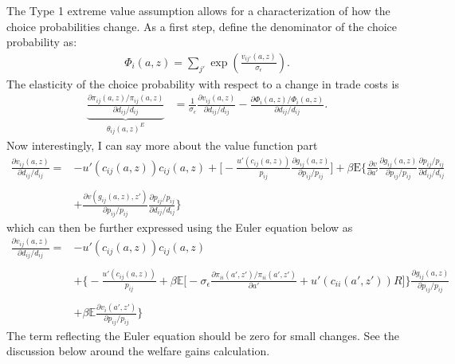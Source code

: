 \documentclass[12pt,pdftex]{article}
\begin{document}
\begin{onehalfspacing}
The Type 1 extreme value assumption allows for a characterization of how the choice probabilities change. As a first step, define the denominator of the choice probability as:
\begin{align}
\Phi_{i}(a,z) = \sum_{j'} \exp \left( \frac{ v_{ij'}(a, z) }{\sigma_{\epsilon}} \right).
\end{align}
The elasticity of the choice probability with respect to a change in trade costs is
\begin{align}
\underbrace{ \frac{\partial \pi_{ij}(a,z) / \pi_{ij}(a,z)}{\partial d_{ij} / d_{ij}} }_{\theta_{ij}(a,z)^{E}} &= \frac{1}{\sigma_{\epsilon}}\frac{\partial v_{ij}(a,z)}{\partial d_{ij}/d_{ij}} -  \frac{\partial \Phi_{i}(a,z) / \Phi_{i}(a,z)}{\partial d_{ij}/d_{ij}}.
\label{eq:apx-extensive-margin}
\end{align}
Now interestingly, I can say more about the value function part
\begin{align}
\frac{\partial v_{ij}(a,z)}{\partial d_{ij}/d_{ij}}  =& -u'(c_{ij}(a,z))c_{ij}(a,z) + \bigg [ -\frac{u'(c_{ij}(a,z))}{p_{ij}}\frac{\partial g_{ij}(a,z)}{\partial p_{ij}/ p_{ij}} \bigg ] + \beta \mathrm{E} \bigg \{\frac{\partial v}{\partial a'}\frac{\partial g_{ij}(a,z)}{\partial p_{ij}/ p_{ij}}\frac{ \partial p_{ij}/ p_{ij}}{\partial d_{ij}/ d_{ij}}  \\
\nonumber \\
&+  \frac{\partial v(g_{ij}(a,z),z')}{\partial p_{ij}/ p_{ij}}\frac{ \partial p_{ij}/ p_{ij}}{\partial d_{ij}/ d_{ij}} \bigg \}
\end{align}
which can then be further expressed using the Euler equation below as
\begin{align}
\frac{\partial v_{ij}(a,z)}{\partial d_{ij}/d_{ij}}  =& -u'(c_{ij}(a,z))c_{ij}(a,z) \\
\nonumber \\
&+ \bigg \{ -\frac{u'(c_{ij}(a,z))}{p_{ij}} + \beta \mathbb{E} \bigg [ -\sigma_{\epsilon} \frac{\partial \pi_{ii}(a',z') / \pi_{ii}(a',z')}{\partial a'} + u'(c_{ii}(a',z'))R \bigg ] \bigg \} \frac{\partial g_{ij}(a,z)}{\partial p_{ij}/ p_{ij}} \\
\nonumber \\
&+  \beta \mathbb{E}\frac{\partial v_{i}(a',z')}{\partial p_{ij}/ p_{ij}} \bigg \}
\end{align}
The term reflecting the Euler equation should be zero for small changes. See the discussion below around the welfare gains calculation. 



\end{onehalfspacing}
\end{document}

